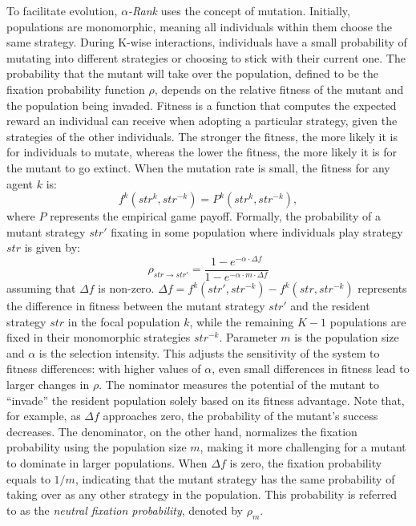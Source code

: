         \noindent
        To facilitate evolution, \emph{$\alpha$-Rank} uses the concept of mutation. Initially, populations are monomorphic, meaning all individuals within them choose the same strategy. During K-wise interactions, individuals have a small probability of mutating into different strategies or choosing to stick with their current one. The probability that the mutant will take over the population, defined to be the fixation probability function $\rho$, depends on the relative fitness of the mutant and the population being invaded. Fitness is a function that computes the expected reward an individual can receive when adopting a particular strategy, given the strategies of the other individuals. The stronger the fitness, the more likely it is for individuals to mutate, whereas the lower the fitness, the more likely it is for the mutant to go extinct. When the mutation rate is small, the fitness for any agent $k$ is:
        \begin{equation}
            f^k(str^{k}, str^{-k}) = P^k(str^{k}, str^{-k}),
            \label{eq:fitness_k}
        \end{equation}
        where $P$ represents the empirical game payoff. Formally, the probability of a mutant strategy $str'$ fixating in some population where individuals play strategy $str$ is given by:
        \begin{equation}
            \rho_{str \to str'} = \frac{1 - e^{-\alpha \cdot \Delta f}}{1 - e^{-\alpha \cdot m \cdot \Delta f}} 
            \label{eq:fixation_prob}
        \end{equation}
        assuming that $\Delta f$ is non-zero. $\Delta f = f^k(str', str^{-k}) - f^k(str, str^{-k})$ represents the difference in fitness between the mutant strategy $str'$ and the resident strategy $str$ in the focal population $k$, while the remaining $K - 1$ populations are fixed in their monomorphic strategies $str^{-k}$. Parameter $m$ is the population size and $\alpha$ is the selection intensity. This adjusts the sensitivity of the system to fitness differences: with higher values of $\alpha$, even small differences in fitness lead to larger changes in $\rho$. The nominator measures the potential of the mutant to ``invade'' the resident population solely based on its fitness advantage. Note that, for example, as $\Delta f$ approaches zero, the probability of the mutant's success decreases. The denominator, on the other hand, normalizes the fixation probability using the population size $m$, making it more challenging for a mutant to dominate in larger populations. When $\Delta f$ is zero, the fixation probability equals to $1/m$, indicating that the mutant strategy has the same probability of taking over as any other strategy in the population. This probability is referred to as the \emph{neutral fixation probability}, denoted by $\rho_m$.

